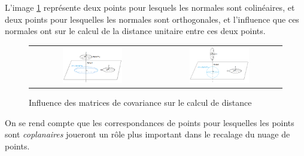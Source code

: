L'image \ref{fig_cov} représente deux points pour lesquels les normales sont colinéaires, et deux points pour lesquelles les normales sont orthogonales, et l'influence que ces normales ont sur le calcul de la distance unitaire entre ces deux points.

\begin{figure}[H]
\centering
\begin{tabular}{cc}
\includegraphics[width = 0.5\textwidth]{Images/Proposition/covcol} &
\includegraphics[width = 0.5\textwidth]{Images/Proposition/covorth}
\end{tabular}
\caption{Influence des matrices de covariance sur le calcul de distance}
\label{fig_cov}
\end{figure}


On se rend compte que les correspondances de points pour lesquelles les points sont \textit{coplanaires} joueront un rôle plus important dans le recalage du nuage de points.



